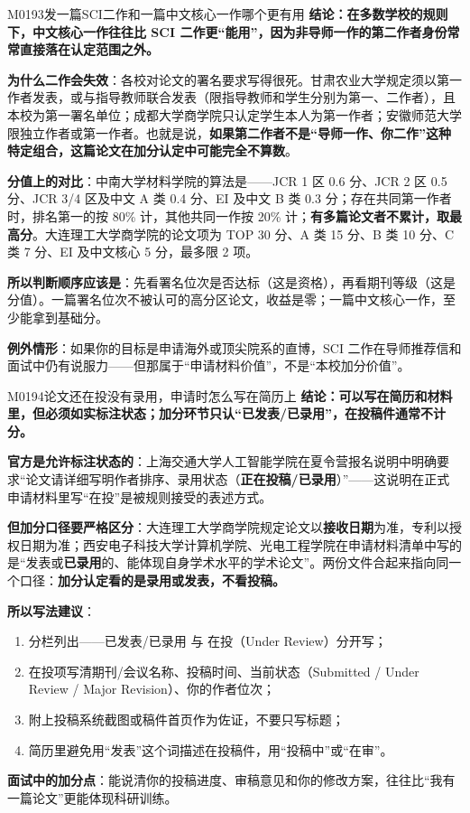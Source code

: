 \begin{qa}{M0193}{发一篇SCI二作和一篇中文核心一作哪个更有用}
\textbf{结论：在多数学校的规则下，中文核心一作往往比 SCI 二作更“能用”，因为非导师一作的第二作者身份常常直接落在认定范围之外。}

\textbf{为什么二作会失效}：各校对论文的署名要求写得很死。甘肃农业大学规定须以第一作者发表，或与指导教师联合发表（限指导教师和学生分别为第一、二作者），且本校为第一署名单位；成都大学商学院只认定学生本人为第一作者；安徽师范大学限独立作者或第一作者。也就是说，\textbf{如果第二作者不是“导师一作、你二作”这种特定组合，这篇论文在加分认定中可能完全不算数}。

\textbf{分值上的对比}：中南大学材料学院的算法是——JCR 1 区 0.6 分、JCR 2 区 0.5 分、JCR 3/4 区及中文 A 类 0.4 分、EI 及中文 B 类 0.3 分；存在共同第一作者时，排名第一的按 80\% 计，其他共同一作按 20\% 计；\textbf{有多篇论文者不累计，取最高分}。大连理工大学商学院的论文项为 TOP 30 分、A 类 15 分、B 类 10 分、C 类 7 分、EI 及中文核心 5 分，最多限 2 项。

\textbf{所以判断顺序应该是}：先看署名位次是否达标（这是资格），再看期刊等级（这是分值）。一篇署名位次不被认可的高分区论文，收益是零；一篇中文核心一作，至少能拿到基础分。

\textbf{例外情形}：如果你的目标是申请海外或顶尖院系的直博，SCI 二作在导师推荐信和面试中仍有说服力——但那属于“申请材料价值”，不是“本校加分价值”。
\end{qa}

\begin{qa}{M0194}{论文还在投没有录用，申请时怎么写在简历上}
\textbf{结论：可以写在简历和材料里，但必须如实标注状态；加分环节只认“已发表/已录用”，在投稿件通常不计分。}

\textbf{官方是允许标注状态的}：上海交通大学人工智能学院在夏令营报名说明中明确要求“论文请详细写明作者排序、录用状态（\textbf{正在投稿/已录用}）”——这说明在正式申请材料里写“在投”是被规则接受的表述方式。

\textbf{但加分口径要严格区分}：大连理工大学商学院规定论文以\textbf{接收日期}为准，专利以授权日期为准；西安电子科技大学计算机学院、光电工程学院在申请材料清单中写的是“发表或\textbf{已录用}的、能体现自身学术水平的学术论文”。两份文件合起来指向同一个口径：\textbf{加分认定看的是录用或发表，不看投稿。}

\textbf{所以写法建议}：
\begin{enumerate}
  \item 分栏列出——已发表/已录用 与 在投（Under Review）分开写；
  \item 在投项写清期刊/会议名称、投稿时间、当前状态（Submitted / Under Review / Major Revision）、你的作者位次；
  \item 附上投稿系统截图或稿件首页作为佐证，不要只写标题；
  \item 简历里避免用“发表”这个词描述在投稿件，用“投稿中”或“在审”。
\end{enumerate}

\textbf{面试中的加分点}：能说清你的投稿进度、审稿意见和你的修改方案，往往比“我有一篇论文”更能体现科研训练。
\end{qa}

